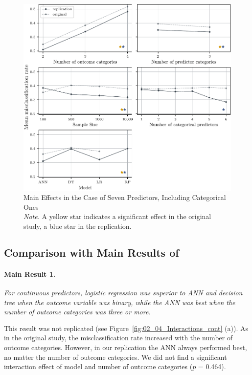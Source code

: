 \documentclass[12pt]{article}
\begin{document}
    \begin{figure}[h]
        \centering
        \includegraphics{fig/15_mainEffects_V7.pdf}
        \caption{Main Effects in the Case of Seven Predictors, Including Categorical Ones \\
        \textit{Note.} A yellow star indicates a significant effect in the original study, a blue star in the replication.}
        \label{fig:15_mainEffects_V7}
    \end{figure}


\subsection{Comparison with Main Results of \textcite{kim:10}}

    \paragraph{Main Result 1.}
    \textit{For continuous predictors, logistic regression was superior to ANN and decision tree when the outcome variable was binary, while the ANN was best when the number of outcome categories was three or more.}

    This result was not replicated (see Figure~\ref{fig:02_04_Interactions_cont} (a)). As in the original study, the misclassification rate increased with the number of outcome categories. However, in our replication the ANN always performed best, no matter the number of outcome categories. We did not find a significant interaction effect of model and number of outcome categories ($p$ = 0.464).
\end{document}
